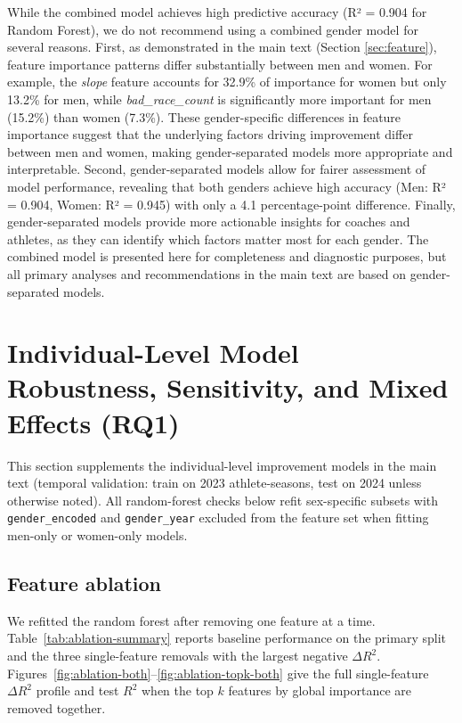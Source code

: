 \documentclass[suppldata]{interact}
\theoremstyle{plain}%
\theoremstyle{definition}
\theoremstyle{remark}
\begin{document}
While the combined model achieves high predictive accuracy (R² = 0.904 for Random Forest), we do not recommend using a combined gender model for several reasons. First, as demonstrated in the main text (Section \ref{sec:feature}), feature importance patterns differ substantially between men and women. For example, the \textit{slope} feature accounts for 32.9\% of importance for women but only 13.2\% for men, while \textit{bad\_race\_count} is significantly more important for men (15.2\%) than women (7.3\%). These gender-specific differences in feature importance suggest that the underlying factors driving improvement differ between men and women, making gender-separated models more appropriate and interpretable. Second, gender-separated models allow for fairer assessment of model performance, revealing that both genders achieve high accuracy (Men: R² = 0.904, Women: R² = 0.945) with only a 4.1 percentage-point difference. Finally, gender-separated models provide more actionable insights for coaches and athletes, as they can identify which factors matter most for each gender. The combined model is presented here for completeness and diagnostic purposes, but all primary analyses and recommendations in the main text are based on gender-separated models.

\FloatBarrier
\section{Individual-Level Model Robustness, Sensitivity, and Mixed Effects (RQ1)}
\label{app:rq1_ml_supplement}

This section supplements the individual-level improvement models in the main text (temporal validation: train on 2023 athlete-seasons, test on 2024 unless otherwise noted). All random-forest checks below refit sex-specific subsets with \texttt{gender\_encoded} and \texttt{gender\_year} excluded from the feature set when fitting men-only or women-only models.

\subsection{Feature ablation}
\label{app:rq1_ablation}

We refitted the random forest after removing one feature at a time. Table~\ref{tab:ablation-summary} reports baseline performance on the primary split and the three single-feature removals with the largest negative $\Delta R^2$. Figures~\ref{fig:ablation-both}--\ref{fig:ablation-topk-both} give the full single-feature $\Delta R^2$ profile and test $R^2$ when the top $k$ features by global importance are removed together.
\end{document}
